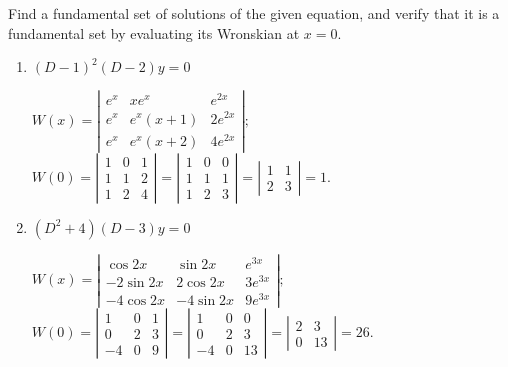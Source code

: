 \documentclass{ximera}
\begin{document}
\begin{problem}\label{exer:9.2.28}
Find a fundamental set of solutions of the given equation, and verify that it is a fundamental set by evaluating its Wronskian at $x=0$.

\begin{enumerate}
    \item $(D-1)^2(D-2)y=0$

\begin{solution}
$
W(x)=\left|\begin{array}{ccc}
e^x&xe^x&e^{2x}\\
e^x&e^x(x+1)&2e^{2x}\\
e^x&e^x(x+2)&4e^{2x}
\end{array}\right|;
$
$
W(0)=\left|\begin{array}{cccc}
1&0&1\\1&1&2\\1&2&4
\end{array}\right|=
\left|\begin{array}{cccc}
1&0&0\\1&1&1\\1&2&3
\end{array}\right|
=\left|\begin{array}{cccc}
1&1\\2&3\end{array}\right|=1.
$
\end{solution}

    \item $(D^2+4)(D-3)y=0$

\begin{solution}
$
W(x)=\left|\begin{array}{ccc}
\cos 2x&\sin 2x&e^{3x}\\
-2\sin 2x&2\cos 2x&3e^{3x}\\
-4\cos 2x&-4\sin 2x&9e^{3x}
\end{array}\right|;
$
$
W(0)=\left|\begin{array}{rccc}
1&0&1\\0&2&3\\-4&0&9
\end{array}\right|=
\left|\begin{array}{rccc}
1&0&0\\0&2&3\\-4&0&13
\end{array}\right|=
\left|\begin{array}{rccc}
2&3\\0&13\end{array}\right|=26.
$
\end{solution}


\end{enumerate}
\end{problem}
\end{document}
